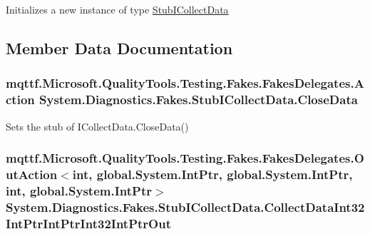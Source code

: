 Initializes a new instance of type \hyperlink{class_system_1_1_diagnostics_1_1_fakes_1_1_stub_i_collect_data}{Stub\-I\-Collect\-Data}



\subsection{Member Data Documentation}
\hypertarget{class_system_1_1_diagnostics_1_1_fakes_1_1_stub_i_collect_data_abe640597ea42ccba7bd959a90f390e51}{
\subsubsection[{Close\-Data}]{\setlength{\rightskip}{0pt plus 5cm}mqttf.\-Microsoft.\-Quality\-Tools.\-Testing.\-Fakes.\-Fakes\-Delegates.\-Action System.\-Diagnostics.\-Fakes.\-Stub\-I\-Collect\-Data.\-Close\-Data}}\label{class_system_1_1_diagnostics_1_1_fakes_1_1_stub_i_collect_data_abe640597ea42ccba7bd959a90f390e51}


Sets the stub of I\-Collect\-Data.\-Close\-Data()

\hypertarget{class_system_1_1_diagnostics_1_1_fakes_1_1_stub_i_collect_data_a5243f9a8ba2dd9cfddd1812b85fcae80}{
\subsubsection[{Collect\-Data\-Int32\-Int\-Ptr\-Int\-Ptr\-Int32\-Int\-Ptr\-Out}]{\setlength{\rightskip}{0pt plus 5cm}mqttf.\-Microsoft.\-Quality\-Tools.\-Testing.\-Fakes.\-Fakes\-Delegates.\-Out\-Action$<$int, global.\-System.\-Int\-Ptr, global.\-System.\-Int\-Ptr, int, global.\-System.\-Int\-Ptr$>$ System.\-Diagnostics.\-Fakes.\-Stub\-I\-Collect\-Data.\-Collect\-Data\-Int32\-Int\-Ptr\-Int\-Ptr\-Int32\-Int\-Ptr\-Out}}\label{class_system_1_1_diagnostics_1_1_fakes_1_1_stub_i_collect_data_a5243f9a8ba2dd9cfddd1812b85fcae80}


